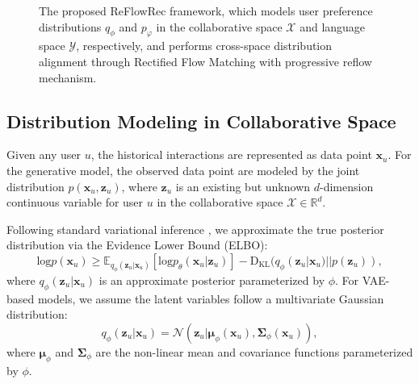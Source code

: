 \documentclass[sigconf]{acmart}
\begin{document}
\begin{figure}[t]
\setlength{\abovecaptionskip}{0.1cm}
\setlength{\belowcaptionskip}{0.1cm} 
\centering
\caption{
The proposed \textsf{ReFlowRec} framework, which models user preference distributions $q_\phi$ and $p_\varphi$ in the collaborative space $\mathcal X$ and language space $\mathcal Y$, respectively, and performs cross-space distribution alignment through Rectified Flow Matching with progressive reflow mechanism.}
\label{fig_model}
\end{figure}

\subsection{Distribution Modeling in Collaborative Space}
Given any user $u$, the historical interactions are represented as data point $\mathbf x_u$. For the generative model, the observed data point are modeled by the joint distribution $p(\mathbf x_u, \mathbf z_u)$, where $\mathbf z_u$ is an existing but unknown $d$-dimension continuous variable for user $u$ in the collaborative space $\mathcal X \in \mathbb R^{d}$. 

Following standard variational inference \cite{kingma2013auto, liang2018variational}, we approximate the true posterior distribution via the Evidence Lower Bound (ELBO):
\begin{equation}
\label{elbo}
\text{log}p(\mathbf x_u) \ge \mathbb E_{q_{\phi}(\mathbf z_u|\mathbf x_u)}[\text{log}p_{\theta}(\mathbf x_u|\mathbf z_u)] - \text{D}_{\text{KL}}(q_{\phi}(\mathbf z_u|\mathbf x_u)||p(\mathbf z_u)),
\end{equation}
where $q_{\phi}(\mathbf z_u|\mathbf x_u)$ is an approximate posterior parameterized by $\phi$. For VAE-based models, we assume the latent variables follow a multivariate Gaussian distribution:
\begin{equation}
\label{vae_q}
q_{\phi}(\mathbf z_u|\mathbf x_u)=\mathcal N\left (\mathbf z_u|\boldsymbol\mu_\phi(\mathbf x_u), \boldsymbol\Sigma_{\phi}(\mathbf x_u)\right),
\end{equation}
where $\boldsymbol\mu_\phi$ and $\boldsymbol\Sigma_{\phi}$ are the non-linear mean and covariance functions parameterized by $\phi$.
\end{document}
